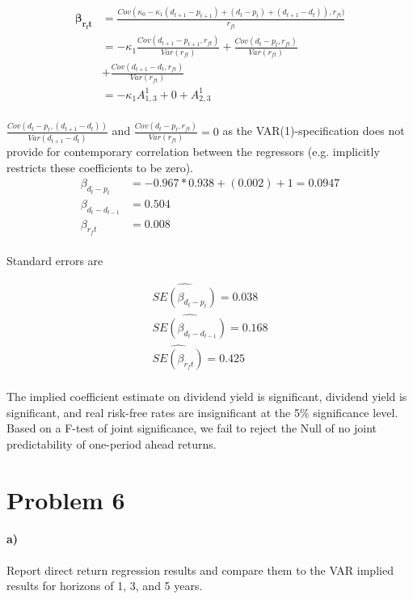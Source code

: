 \documentclass[11pt,letter]{article}
\begin{document}
\begin{align*}
\boldsymbol{\beta_{r_ft}} &= \frac{Cov(\kappa_0 - \kappa_1 (d_{t+1}-p_{t+1})+ (d_t-p_t) + (d_{t+1}-d_t)),r_{ft})}{r_{ft}}\\
&= -\kappa_1 \frac{Cov(d_{t+1}-p_{t+1},r_{ft})}{Var(r_{ft})} +\frac{Cov(d_{t}-p_{t},r_{ft})}{Var(r_{ft})}\\ &+\frac{Cov(d_{t+1}-d_{t},r_{ft})}{Var(r_{ft})}\\
&= -\kappa_1 A^1_{1,3} + 0 + A^1_{2,3}\\
\end{align*}

$\frac{Cov(d_{t}-p_{t},(d_{t+1}-d_t))}{Var(d_{t+1}-d_t)}$ and $\frac{Cov(d_{t}-p_{t},r_{ft})}{Var(r_{ft})}=0$ as the VAR(1)-specification does not provide for contemporary correlation between the regressors (e.g. implicitly restricts these coefficients to be zero). \\

\begin{align*}
\beta_{d_t-p_t} &= -0.967 * 0.938 + (0.002) + 1 = 0.0947\\
\beta_{d_t - d_{t-1}} &=  0.504\\
\beta_{r_ft} &= 0.008\\
\end{align*}

Standard errors are	

\begin{align*}
\hat{SE(\beta_{d_t-p_t})}=0.038\\
\hat{SE(\beta_{d_t - d_{t-1}})}=0.168\\
\hat{SE(\beta_{r_ft})}=0.425\\
\end{align*}

The implied coefficient estimate on dividend yield is significant, dividend yield is significant, and real risk-free rates are insignificant at the 5\% significance level. Based on a F-test of joint significance, we fail to reject the Null of no joint predictability of one-period ahead returns.



\section*{Problem 6}
\paragraph{a)}Report direct return regression results and compare them to the VAR implied results for horizons of 1, 3, and 5 years. \\
\end{document}
